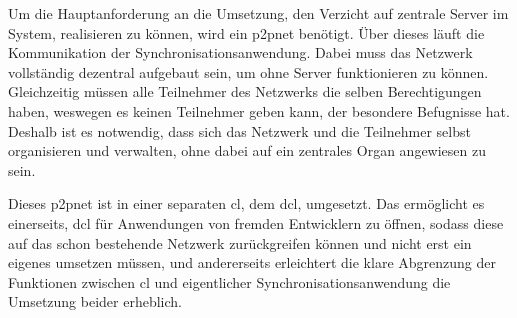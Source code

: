 
Um die Hauptanforderung an die Umsetzung, den Verzicht auf zentrale Server im System, realisieren zu können,
wird ein \gls{p2pnet} benötigt. Über dieses läuft die Kommunikation der Synchronisationsanwendung.
Dabei muss das Netzwerk vollständig dezentral aufgebaut sein, um ohne Server funktionieren zu können.
Gleichzeitig müssen alle Teilnehmer des Netzwerks die selben Berechtigungen haben, weswegen es keinen
Teilnehmer geben kann, der besondere Befugnisse hat. Deshalb ist es notwendig, dass sich das Netzwerk
und die Teilnehmer selbst organisieren und verwalten, ohne dabei auf ein zentrales Organ angewiesen
zu sein.

Dieses \gls{p2pnet} ist in einer separaten \gls{cl}, dem \gls{dcl}, umgesetzt.
Das ermöglicht es einerseits, \gls{dcl} für Anwendungen von fremden Entwicklern zu öffnen, sodass diese auf das schon bestehende Netzwerk
zurückgreifen können und nicht erst ein eigenes umsetzen müssen, und andererseits erleichtert die klare Abgrenzung der Funktionen
zwischen \gls{cl} und eigentlicher Synchronisationsanwendung die Umsetzung beider erheblich.
